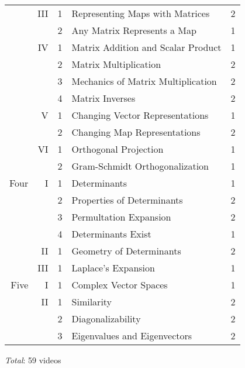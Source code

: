 \documentclass{article}
\begin{document}
\begin{center}
\begin{tabular}{|rrc|ll|}
      &III &1 &Representing Maps with Matrices    &2   \\
      &    &2 &Any Matrix Represents a Map        &1   \\
      \cline{4-5}
      &IV  &1 &Matrix Addition and Scalar Product &1   \\
      &    &2 &Matrix Multiplication              &2   \\
      &    &3 &Mechanics of Matrix Multiplication &2   \\
      &    &4 &Matrix Inverses                    &2   \\
      \cline{4-5}
      &V   &1 &Changing Vector Representations    &1   \\
      &    &2 &Changing Map Representations       &2   \\
      \cline{4-5}
      &VI  &1 &Orthogonal Projection              &1   \\
      &    &2 &Gram-Schmidt Orthogonalization     &1   \\
  \hline
 Four &I   &1 &Determinants                       &1   \\
      &    &2 &Properties of Determinants         &2   \\
      &    &3 &Permultation Expansion             &2   \\
      &    &4 &Determinants Exist                 &1   \\
      \cline{4-5}
      &II  &1 &Geometry of Determinants           &2   \\
      \cline{4-5}
      &III &1 &Laplace's Expansion                &1   \\
 \hline
 Five &I   &1 &Complex Vector Spaces              &1   \\
      \cline{4-5}
      &II  &1 &Similarity                         &2   \\
      &    &2 &Diagonalizability                  &2   \\
      &    &3 &Eigenvalues and Eigenvectors       &2   \\
 \hline
\end{tabular}
\end{center}
\vspace{1ex}
\textit{Total}: 59 videos
\end{document}
